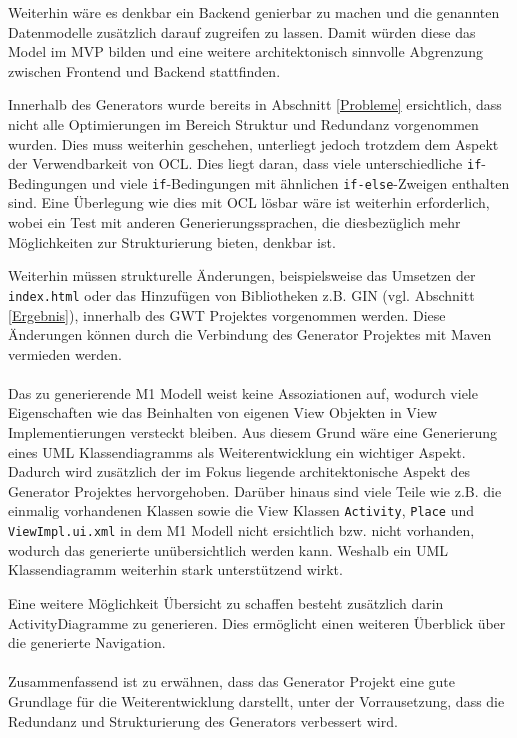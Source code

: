 Weiterhin wäre es denkbar ein Backend genierbar zu machen und die
genannten Datenmodelle zusätzlich darauf zugreifen zu lassen. Damit würden
diese das Model im MVP bilden und eine weitere architektonisch sinnvolle Abgrenzung zwischen Frontend
und Backend stattfinden.

Innerhalb des Generators wurde bereits in Abschnitt \ref{Probleme} ersichtlich,
dass nicht alle Optimierungen im Bereich Struktur und Redundanz vorgenommen wurden.
Dies muss weiterhin geschehen, unterliegt jedoch trotzdem dem Aspekt der
Verwendbarkeit von OCL. Dies liegt daran, dass viele
unterschiedliche \texttt{if}-Bedingungen und viele \texttt{if}-Bedingungen mit
ähnlichen \texttt{if-else}-Zweigen enthalten sind. Eine Überlegung wie dies mit
OCL lösbar wäre ist weiterhin erforderlich, wobei ein Test mit anderen Generierungssprachen,
die diesbezüglich mehr Möglichkeiten zur Strukturierung bieten, denkbar ist.

Weiterhin müssen strukturelle Änderungen, beispielsweise das Umsetzen der
\texttt{index.html} oder das Hinzufügen von Bibliotheken z.B. GIN (vgl.
Abschnitt \ref{Ergebnis}), innerhalb des GWT Projektes vorgenommen werden. Diese
Änderungen können durch die Verbindung des Generator Projektes mit Maven vermieden werden.
\\\\
Das zu generierende M1 Modell weist keine Assoziationen auf, wodurch viele
Eigenschaften wie das Beinhalten von eigenen View Objekten in View
Implementierungen versteckt bleiben. Aus diesem Grund wäre eine Generierung
eines UML Klassendiagramms als Weiterentwicklung ein wichtiger Aspekt. Dadurch wird zusätzlich der im Fokus
liegende architektonische Aspekt des Generator Projektes hervorgehoben.
Darüber hinaus sind viele Teile wie z.B. die einmalig vorhandenen Klassen sowie die View
Klassen \texttt{Activity}, \texttt{Place} und \texttt{ViewImpl.ui.xml} in
dem M1 Modell nicht ersichtlich bzw. nicht vorhanden, wodurch das generierte
unübersichtlich werden kann. Weshalb ein UML Klassendiagramm weiterhin stark unterstützend wirkt. 

Eine weitere Möglichkeit Übersicht zu schaffen besteht zusätzlich darin
ActivityDiagramme zu generieren. Dies ermöglicht einen weiteren Überblick über
die generierte Navigation.
\\\\
Zusammenfassend ist zu erwähnen, dass das Generator Projekt eine gute
Grundlage für die Weiterentwicklung darstellt, unter der Vorrausetzung, dass die
Redundanz und Strukturierung des Generators verbessert wird.
